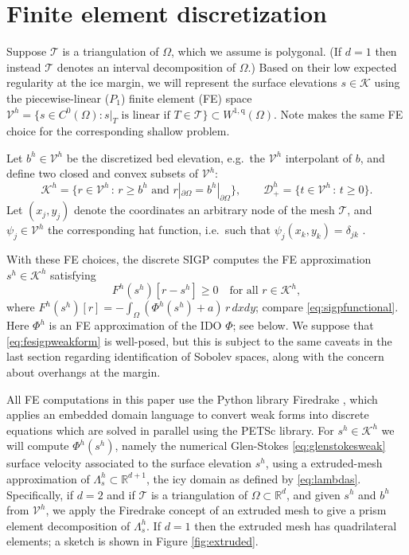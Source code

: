 \documentclass[letterpaper,final,12pt,reqno]{amsart}
\theoremstyle{claim}
\newcommand{\RR}{\mathbb{R}}
\newcommand{\qq}{{\text{q}}}
\numberwithin{equation}{section}
\numberwithin{figure}{section}
\numberwithin{table}{section}
\numberwithin{theorem}{section}
\begin{document}
\section{Finite element discretization} \label{sec:fe}

Suppose $\mathcal{T}$ is a triangulation of $\Omega$, which we assume is polygonal.  (If $d=1$ then instead $\mathcal{T}$ denotes an interval decomposition of $\Omega$.)  Based on their low expected regularity at the ice margin, we will represent the surface elevations $s\in \mathcal{K}$ using the piecewise-linear ($P_1$) finite element (FE) space $\mathcal{V}^h = \{s \in C^0(\Omega) : s|_T \text{ is linear if } T \in \mathcal{T}\} \subset W^{1,\qq}(\Omega)$.  Note \cite{JouvetBueler2012} makes the same FE choice for the corresponding shallow problem.

Let $b^h \in \mathcal{V}^h$ be the discretized bed elevation, e.g.~the $\mathcal{V}^h$ interpolant of $b$, and define two closed and convex subsets of $\mathcal{V}^h$:
\begin{equation}
\mathcal{K}^h = \{r \in \mathcal{V}^h \,:\, r \ge b^h \text{ and } r|_{\partial\Omega} = b^h|_{\partial\Omega}\}, \qquad \mathcal{D}_+^h = \{t \in \mathcal{V}^h \,:\, t \ge 0\}. \label{eq:feKD}
\end{equation}
Let $(x_j,y_j)$ denote the coordinates an arbitrary node of the mesh $\mathcal{T}$, and $\psi_j \in \mathcal{V}^h$ the corresponding hat function, i.e.~such that $\psi_j(x_k,y_k)=\delta_{jk}$ \cite{Elmanetal2014}.

With these FE choices, the discrete SIGP computes the FE approximation $s^h \in \mathcal{K}^h$ satisfying
\begin{equation}
F^h(s^h)[r - s^h] \ge 0 \quad \text{for all } r \in \mathcal{K}^h , \label{eq:fesigpweakform}
\end{equation}
where $F^h(s^h)[r] = - \int_\Omega (\Phi^h(s^h) + a)\, r \,dx dy$; compare \eqref{eq:sigpfunctional}.  Here $\Phi^h$ is an FE approximation of the IDO $\Phi$; see below.  We suppose that \eqref{eq:fesigpweakform} is well-posed, but this is subject to the same caveats in the last section regarding identification of Sobolev spaces, along with the concern about overhangs at the margin.

All FE computations in this paper use the Python library Firedrake \cite{Rathgeberetal2016}, which applies an embedded domain language \cite{Alnaesetal2014} to convert weak forms into discrete equations which are solved in parallel using the PETSc \cite{Balayetal2020} library.  For $s^h \in \mathcal{K}^h$ we will compute $\Phi^h(s^h)$, namely the numerical Glen-Stokes \eqref{eq:glenstokesweak} surface velocity associated to the surface elevation $s^h$, using a extruded-mesh approximation of $\Lambda_s^h \subset \RR^{d+1}$, the icy domain as defined by \eqref{eq:lambdas}.  Specifically, if $d=2$ and if $\mathcal{T}$ is a triangulation of $\Omega \subset \RR^d$, and given $s^h$ and $b^h$ from $\mathcal{V}^h$, we apply the Firedrake concept of an extruded mesh \cite{McRaeetal2016} to give a prism element decomposition of $\Lambda_s^h$.  If $d=1$ then the extruded mesh has quadrilateral elements; a sketch is shown in Figure \ref{fig:extruded}.
\end{document}
